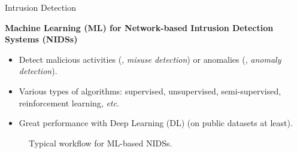   
  

\begin{frame}{Intrusion Detection}
  
  \textbf{Machine Learning (ML) for Network-based Intrusion Detection Systems (NIDSs)}
  \begin{itemize}
    \item Detect \alert{malicious} activities (\ie, \textit{misuse detection}) or \alert{anomalies} (\ie, \textit{anomaly detection}).
    \item Various types of algorithms: \alert<2>{supervised}, unsupervised, semi-supervised, reinforcement learning, \textit{etc}.
    \item Great performance with Deep Learning (DL) (on public datasets at least).
  \end{itemize}
  \bigskip
    
  \begin{figure}
    \centering
    \caption{Typical workflow for ML-based NIDSs.}
  \end{figure}
\end{frame}

